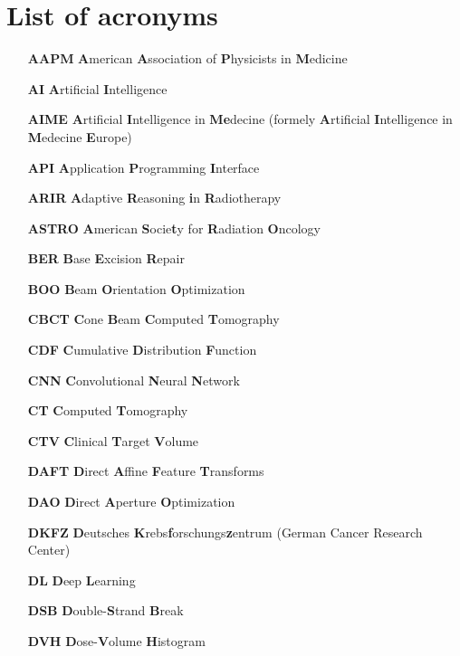 \chapter*{List of acronyms}
\begin{itemize}
	\setlength{\itemindent}{2cm}
	\item[\textbf{AAPM}] \textbf{A}merican \textbf{A}ssociation of \textbf{P}hysicists in \textbf{M}edicine
	\item[\textbf{AI}] \textbf{A}rtificial \textbf{I}ntelligence
	\item[\textbf{AIME}] \textbf{A}rtificial \textbf{I}ntelligence in \textbf{Me}decine (formely \textbf{A}rtificial \textbf{I}ntelligence in \textbf{M}edecine \textbf{E}urope)
	\item[\textbf{API}] \textbf{A}pplication \textbf{P}rogramming \textbf{I}nterface
	\item[\textbf{ARIR}] \textbf{A}daptive \textbf{R}easoning \textbf{i}n \textbf{R}adiotherapy
	\item[\textbf{ASTRO}] \textbf{A}merican \textbf{S}ocie\textbf{t}y for \textbf{R}adiation \textbf{O}ncology
	\item[\textbf{BER}] \textbf{B}ase \textbf{E}xcision \textbf{R}epair
	\item[\textbf{BOO}] \textbf{B}eam \textbf{O}rientation \textbf{O}ptimization
	\item[\textbf{CBCT}] \textbf{C}one \textbf{B}eam \textbf{C}omputed \textbf{T}omography
	\item[\textbf{CDF}] \textbf{C}umulative \textbf{D}istribution \textbf{F}unction
	\item[\textbf{CNN}] \textbf{C}onvolutional \textbf{N}eural \textbf{N}etwork
	\item[\textbf{CT}] \textbf{C}omputed \textbf{T}omography
	\item[\textbf{CTV}] \textbf{C}linical \textbf{T}arget \textbf{V}olume
	\item[\textbf{DAFT}] \textbf{D}irect \textbf{A}ffine \textbf{F}eature \textbf{T}ransforms
	\item[\textbf{DAO}] \textbf{D}irect \textbf{A}perture \textbf{O}ptimization
	\item[\textbf{DKFZ}] \textbf{D}eutsches \textbf{K}rebs\textbf{f}orschungs\textbf{z}entrum (German Cancer Research Center)
	\item[\textbf{DL}] \textbf{D}eep \textbf{L}earning
	\item[\textbf{DSB}] \textbf{D}ouble-\textbf{S}trand \textbf{B}reak
	\item[\textbf{DVH}] \textbf{D}ose-\textbf{V}olume \textbf{H}istogram

\end{itemize}
